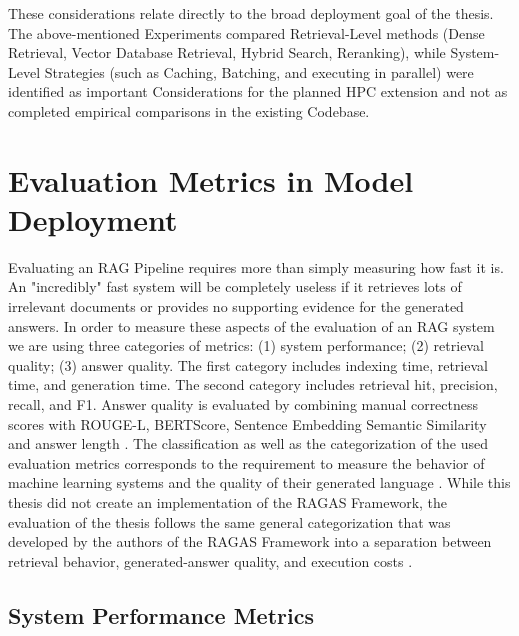 These considerations relate directly to the broad deployment goal of the thesis. The above-mentioned Experiments compared Retrieval-Level methods (Dense Retrieval, Vector Database Retrieval, Hybrid Search, Reranking), while System-Level Strategies (such as Caching, Batching, and executing in parallel) were identified as important Considerations for the planned \ac{HPC} extension and not as completed empirical comparisons in the existing Codebase.

\section{Evaluation Metrics in Model Deployment}

Evaluating an RAG Pipeline requires more than simply measuring how fast it is. An "incredibly" fast system will be completely useless if it retrieves lots of irrelevant documents or provides no supporting evidence for the generated answers. In order to measure these aspects of the evaluation of an RAG system we are using three categories of metrics: (1) system performance; (2) retrieval quality; (3) answer quality. The first category includes indexing time, retrieval time, and generation time. The second category includes retrieval hit, precision, recall, and F1. Answer quality is evaluated by combining manual correctness scores with \ac{ROUGE-L}, \ac{BERTScore}, Sentence Embedding Semantic Similarity and answer length \cite{lin2004rouge,zhang2020bertscore,reimers2019sentencebert}. The classification as well as the categorization of the used evaluation metrics corresponds to the requirement to measure the behavior of machine learning systems and the quality of their generated language \cite{mlsystemsurvey2021,liang2022helm}. While this thesis did not create an implementation of the \ac{RAGAS} Framework, the evaluation of the thesis follows the same general categorization that was developed by the authors of the \ac{RAGAS} Framework into a separation between retrieval behavior, generated-answer quality, and execution costs \cite{es2024ragas}.

\subsection{System Performance Metrics}

